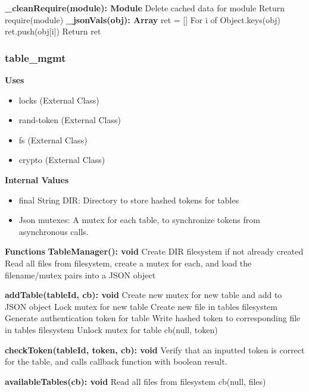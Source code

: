 \documentclass [10pt]{article}
\begin{document}
 \newline
\textbf{\_cleanRequire(module): Module} \newline
Delete cached data for module \newline
Return require(module) \newline
 \newline
\textbf{\_jsonVals(obj): Array} \newline
ret = [] \newline
For i of Object.keys(obj) \newline
	ret.push(obj[i]) \newline
Return ret \newline

\subsubsection{table\_mgmt}
\textbf{Uses}
\begin{itemize}
	\item locks (External Class)
	\item rand-token (External Class)
	\item fs (External Class)
	\item crypto (External Class)
\end{itemize}

\textbf{Internal Values}
\begin{itemize}
	\item final String DIR: Directory to store hashed tokens for tables
	\item Json mutexes: A mutex for each table, to synchronize tokens from asynchronous calls.
\end{itemize}

\textbf{Functions}
\textbf{TableManager(): void}
Create DIR filesystem if not already created
Read all files from filesystem, create a mutex for each, and load the filename/mutex pairs into a JSON object

\textbf{addTable(tableId, cb): void}
Create new mutex for new table and add to JSON object
Lock mutex for new table
Create new file in tables filesystem
Generate authentication token for table
Write hashed token to corresponding file in tables filesystem
Unlock mutex for table
cb(null, token)

\textbf{checkToken(tableId, token, cb): void}
Verify that an inputted token is correct for the table, and calls callback function with boolean result.

\textbf{availableTables(cb): void}
Read all files from filesystem
cb(null, files)
\end{document}
